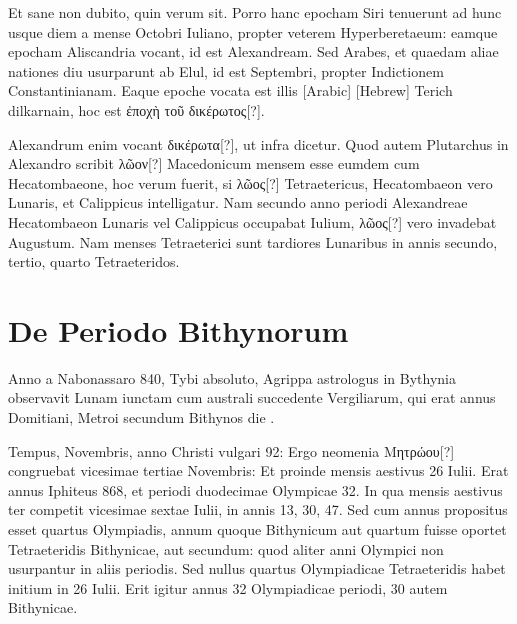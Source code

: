 Et sane non dubito, quin verum sit.
Porro hanc epocham Siri
tenuerunt ad hunc usque diem a mense Octobri Iuliano, propter veterem
Hyperberetaeum: eamque epocham Aliscandria vocant, id est
Alexandream.
Sed Arabes, et quaedam aliae nationes diu usurparunt
ab Elul, id est Septembri, propter Indictionem
Constantinianam.
Eaque epoche vocata
est illis \textarabic{[Arabic]} \texthebrew{[Hebrew]}
Terich dilkarnain, hoc est \textgreek{ἐποχὴ τοῦ δικέρωτος[?]}.
\begin{table}[htbp]
  
\end{table}
Alexandrum enim vocant \textgreek{δικέρωτα[?]}, ut infra
dicetur.
Quod autem Plutarchus in Alexandro
scribit \textgreek{λῶον[?]} Macedonicum mensem esse
eumdem cum Hecatombaeone, hoc verum
fuerit, si \textgreek{λῶος[?]} Tetraetericus, Hecatombaeon
vero Lunaris, et Calippicus intelligatur.
Nam
secundo anno periodi Alexandreae Hecatombaeon
Lunaris vel Calippicus occupabat Iulium, \textgreek{λῶος[?]} vero invadebat
Augustum.
Nam menses Tetraeterici sunt tardiores Lunaribus in
annis secundo, tertio, quarto Tetraeteridos.

\section{De Periodo Bithynorum}

Anno a Nabonassaro 840, Tybi  absoluto, Agrippa astrologus
in Bythynia observavit Lunam iunctam cum australi succedente
Vergiliarum, qui erat annus  Domitiani, Metroi
secundum Bithynos die .
\begin{table}[htbp]
  
\end{table}
Tempus,  Novembris, anno
Christi vulgari 92:
Ergo neomenia \textgreek{Μητρώου[?]} congruebat vicesimae tertiae
Novembris:
Et proinde mensis aestivus 26 Iulii.
Erat annus Iphiteus
868, et periodi duodecimae Olympicae
32.
In qua mensis aestivus ter competit
vicesimae sextae Iulii, in annis 13, 30, 47.
Sed cum annus propositus esset quartus Olympiadis,
annum quoque Bithynicum
aut quartum fuisse oportet Tetraeteridis Bithynicae,
aut secundum: quod aliter anni
Olympici non usurpantur in aliis periodis.
Sed nullus quartus Olympiadicae Tetraeteridis
habet initium in 26 Iulii.
Erit igitur
annus 32 Olympiadicae periodi, 30 autem
Bithynicae.

